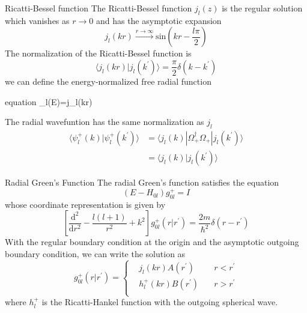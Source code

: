 \documentclass{beamer}
\begin{document}
	\begin{frame}{Ricatti-Bessel function}
		The Ricatti-Bessel function $j_l(z)$ is the regular solution which vanishes as $r\rightarrow0$ and has the asymptotic expansion
		\begin{equation}
			j_l(kr)\stackrel{r\rightarrow\infty}{\longrightarrow}\mathrm{sin}(kr-\dfrac{l\pi}{2})
		\end{equation}
		The normalization of the Ricatti-Bessel function is
		\begin{equation}
			\langle j_l(kr)|j_l(k^\prime)\rangle=\dfrac{\pi}{2}\delta(k-k^\prime)
		\end{equation}
		we can define the energy-normalized free radial function
		\begin{empheq}[box=\fbox]{equation}
			_l(E)=j_l(kr)
		\end{empheq}
		The radial wavefuntion has the same normalization as $j_l$
		\begin{align}
			\langle\psi_l^+(k)|\psi_l^+(k^\prime)\rangle&=\langle j_l(k)|\Omega_+^\dagger\Omega_+|j_l(k^\prime)\rangle\nonumber\\
			&=\langle j_l(k)|j_l(k^\prime)\rangle
		\end{align}
	\end{frame}
	\begin{frame}{Radial Green's Function}
		The radial Green's function satisfies the equation
		\begin{equation}
			(E-H_{0l})g_{0l}^+=I
		\end{equation}
		whose coordinate representation is given by
		\begin{equation}
			\left[ \dfrac{\mathrm{d}^2}{\mathrm{d}r^2}-\dfrac{l(l+1)}{r^2}+k^2 \right]g_{0l}^+(r|r^\prime)=\dfrac{2m}{\hbar^2}\delta(r-r^\prime)
		\end{equation}
		With the regular boundary condition at the origin and the asymptotic outgoing boundary condition, we can write the solution as
		\begin{equation}
			g_{0l}^+(r|r^\prime)=
			\left\{
			\begin{aligned}
				&j_l(kr)A(r^\prime) \quad &r<r^\prime\\
				&h_l^+(kr)B(r^\prime) \quad &r>r^\prime\\
			\end{aligned}
			\right
			.
		\end{equation}
		where $h_l^+$ is the Ricatti-Hankel function with the outgoing spherical wave.
	\end{frame}
\end{document}
